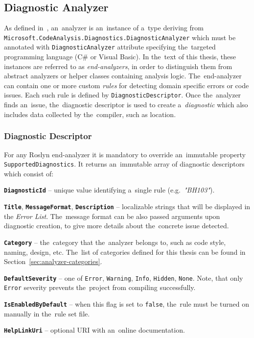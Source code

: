 \documentclass[
  digital, %
  table,   %
  lof,     %
  lot,     %
  oneside,
]{fithesis3}
\begin{document}
\subsection{Diagnostic Analyzer}
As defined in~\cite{roslyn-succinctly}, an~analyzer is an~instance of a~type deriving from \texttt{Microsoft.CodeAnalysis.Diagnostics.DiagnosticAnalyzer} which must be annotated with \texttt{DiagnosticAnalyzer} attribute specifying the~targeted programming language (C\# or Visual Basic). In the~text of this thesis, these instances are referred to as \textit{end-analyzers}, in order to distinguish them from abstract analyzers or helper classes containing analysis logic. The~end-analyzer can contain one or more custom \textit{rules} for detecting domain specific errors or code issues. Each such rule is defined by \texttt{DiagnosticDescriptor}. Once the~analyzer finds an~issue, the~diagnostic descriptor is used to create a~\textit{diagnostic} which also includes data collected by the~compiler, such as location.

\subsubsection{\textbf{Diagnostic Descriptor}}
For any Roslyn end-analyzer it is mandatory to override an~immutable property \texttt{SupportedDiagnostics}. It returns an~immutable array of diagnostic descriptors which consist of:

\smallskip
\begin{compactitem}
  \item[\texttt{\textbf{DiagnosticId}}] -- unique value identifying a~single rule (e.g.~\textit{"BH103"}).
  \item[\texttt{\textbf{Title}}, \texttt{\textbf{MessageFormat}}, \texttt{\textbf{Description}}] -- localizable strings that will be displayed in the \textit{Error List}. The~message format can be also passed arguments upon diagnostic creation, to give more details about the~concrete issue detected.
  \item[\texttt{\textbf{Category}}] -- the~category that the~analyzer belongs to, such as code style, naming, design, etc. The~list of categories defined for this thesis can be found in Section~\ref{sec:analyzer-categories}.
  \item[\texttt{\textbf{DefaultSeverity}}] -- one of \texttt{Error}, \texttt{Warning}, \texttt{Info}, \texttt{Hidden}, \texttt{None}. Note, that only \texttt{Error} severity prevents the~project from compiling successfully.
  \item[\texttt{\textbf{IsEnabledByDefault}}] -- when this flag is set to \texttt{false}, the~rule must be turned on manually in the~rule set file.
  \item[\texttt{\textbf{HelpLinkUri}}] -- optional URI with an~online documentation.
\end{compactitem}
\end{document}
